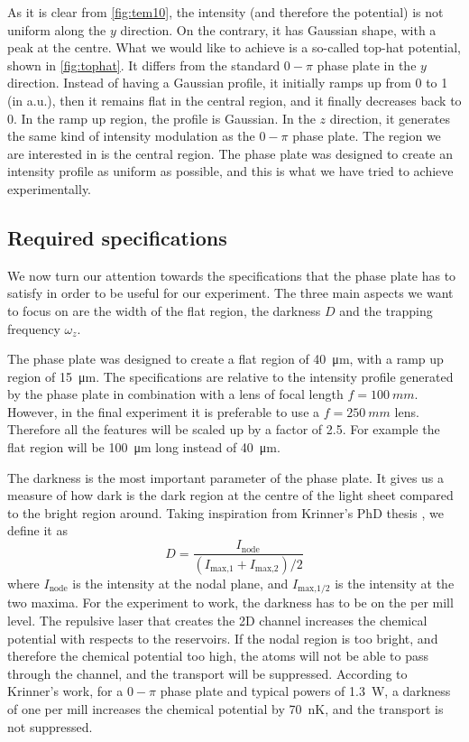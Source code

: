 As it is clear from \cref{fig:tem10}, the intensity (and therefore the potential) is not uniform along the $y$ direction. On the contrary, it has Gaussian shape, with a peak at the centre.
What we would like to achieve is a so-called top-hat potential, shown in \cref{fig:tophat}. It differs from the standard $0-\pi$ phase plate in the $y$ direction. Instead of having a Gaussian profile, it initially ramps up from 0 to 1 (in a.u.), then it remains flat in the central region, and it finally decreases back to 0. In the ramp up region, the profile is Gaussian. In the $z$ direction, it generates the same kind of intensity modulation as the $0-\pi$ phase plate. The region we are interested in is the central region. The phase plate was designed to create an intensity profile as uniform as possible, and this is what we have tried to achieve experimentally.

\subsection{Required specifications}
\label{sec:slm_specifications}
We now turn our attention towards the specifications that the phase plate has to satisfy in order to be useful for our experiment. The three main aspects we want to focus on are the width of the flat region, the darkness $D$ and the trapping frequency $\omega_z$.

The phase plate was designed to create a flat region of \SI{40}{\micro \meter}, with a ramp up region of \SI{15}{\micro\meter}. The specifications are relative to the intensity profile generated by the phase plate in combination with a lens of focal length $f=\SI{100}{mm}$. However, in the final experiment it is preferable to use a $f=\SI{250}{mm}$ lens. Therefore all the features will be scaled up by a factor of 2.5. For example the flat region will be \SI{100}{\micro\meter} long instead of \SI{40}{\micro\meter}.

The darkness is the most important parameter of the phase plate. It gives us a measure of how dark is the dark region at the centre of the light sheet compared to the bright region around. Taking inspiration from Krinner's PhD thesis \cite{krinner2015b}, we define it as
\begin{equation}
    \label{eq:darkness}
    D = \frac{I_\text{node}}{(I_\text{max,1} + I_\text{max,2}) / 2}
\end{equation}
where $I_\text{node}$ is the intensity at the nodal plane, and $I_\text{max,1/2}$ is the intensity at the two maxima. For the experiment to work, the darkness has to be on the per mill level. The repulsive laser that creates the 2D channel increases the chemical potential with respects to the reservoirs. If the nodal region is too bright, and therefore the chemical potential too high, the atoms will not be able to pass through the channel, and the transport will be suppressed. According to Krinner's work, for a $0-\pi$ phase plate and typical powers of \SI{1.3}{W}, a darkness of one per mill increases the chemical potential by \SI{70}{nK}, and the transport is not suppressed.

